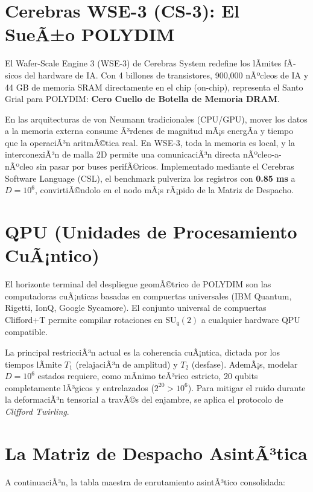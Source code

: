 \section{Cerebras WSE-3 (CS-3): El SueÃ±o POLYDIM}


El Wafer-Scale Engine 3 (WSE-3) de Cerebras System redefine los lÃ­mites fÃ­sicos del hardware de IA. Con 4 billones de transistores, 900,000 nÃºcleos de IA y 44 GB de memoria SRAM directamente en el chip (on-chip), representa el Santo Grial para POLYDIM: \textbf{Cero Cuello de Botella de Memoria DRAM}.

En las arquitecturas de von Neumann tradicionales (CPU/GPU), mover los datos a la memoria externa consume Ã³rdenes de magnitud mÃ¡s energÃ­a y tiempo que la operaciÃ³n aritmÃ©tica real. En WSE-3, toda la memoria es local, y la interconexiÃ³n de malla 2D permite una comunicaciÃ³n directa nÃºcleo-a-nÃºcleo sin pasar por buses perifÃ©ricos. 
Implementado mediante el Cerebras Software Language (CSL), el benchmark pulveriza los registros con \textbf{0.85 ms} a \(D=10^6\), convirtiÃ©ndolo en el nodo mÃ¡s rÃ¡pido de la Matriz de Despacho.

\section{QPU (Unidades de Procesamiento CuÃ¡ntico)}


El horizonte terminal del despliegue geomÃ©trico de POLYDIM son las computadoras cuÃ¡nticas basadas en compuertas universales (IBM Quantum, Rigetti, IonQ, Google Sycamore). El conjunto universal de compuertas Clifford+T permite compilar rotaciones en \(\text{SU}_q(2)\) a cualquier hardware QPU compatible.

La principal restricciÃ³n actual es la coherencia cuÃ¡ntica, dictada por los tiempos lÃ­mite \(T_1\) (relajaciÃ³n de amplitud) y \(T_2\) (desfase). AdemÃ¡s, modelar \(D=10^6\) estados requiere, como mÃ­nimo teÃ³rico estricto, 20 qubits completamente lÃ³gicos y entrelazados (\(2^{20} > 10^6\)). Para mitigar el ruido durante la deformaciÃ³n tensorial a travÃ©s del enjambre, se aplica el protocolo de \textit{Clifford Twirling}.

\section{La Matriz de Despacho AsintÃ³tica}


A continuaciÃ³n, la tabla maestra de enrutamiento asintÃ³tico consolidada:


